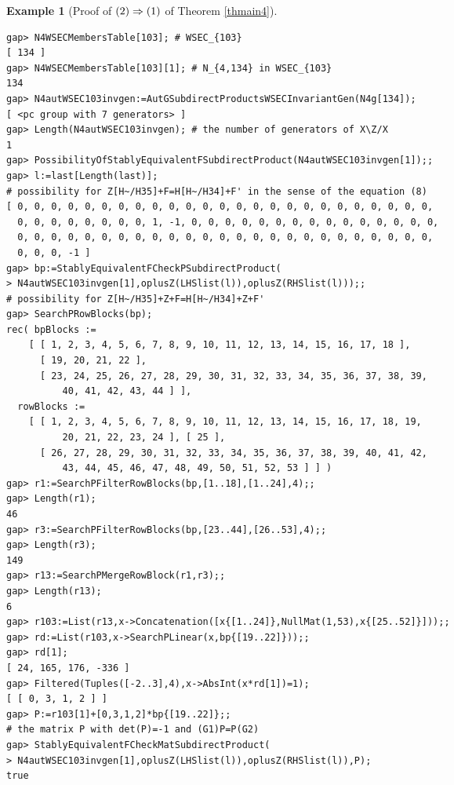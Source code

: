 \documentclass{amsart}
\theoremstyle{plain}
\theoremstyle{definition}
\newtheorem{example}[theorem]{Example}
\theoremstyle{remark}
\begin{document}
\begin{example}[Proof of ${\rm (2)}\Rightarrow {\rm (1)}$ of {Theorem \ref{thmain4}}]
\begin{verbatim}
gap> N4WSECMembersTable[103]; # WSEC_{103}
[ 134 ]
gap> N4WSECMembersTable[103][1]; # N_{4,134} in WSEC_{103}
134
gap> N4autWSEC103invgen:=AutGSubdirectProductsWSECInvariantGen(N4g[134]);
[ <pc group with 7 generators> ]
gap> Length(N4autWSEC103invgen); # the number of generators of X\Z/X
1
gap> PossibilityOfStablyEquivalentFSubdirectProduct(N4autWSEC103invgen[1]);;
gap> l:=last[Length(last)]; 
# possibility for Z[H~/H35]+F=H[H~/H34]+F' in the sense of the equation (8)
[ 0, 0, 0, 0, 0, 0, 0, 0, 0, 0, 0, 0, 0, 0, 0, 0, 0, 0, 0, 0, 0, 0, 0, 0, 0, 
  0, 0, 0, 0, 0, 0, 0, 0, 1, -1, 0, 0, 0, 0, 0, 0, 0, 0, 0, 0, 0, 0, 0, 0, 0, 
  0, 0, 0, 0, 0, 0, 0, 0, 0, 0, 0, 0, 0, 0, 0, 0, 0, 0, 0, 0, 0, 0, 0, 0, 0, 
  0, 0, 0, -1 ]
gap> bp:=StablyEquivalentFCheckPSubdirectProduct(
> N4autWSEC103invgen[1],oplusZ(LHSlist(l)),oplusZ(RHSlist(l)));;
# possibility for Z[H~/H35]+Z+F=H[H~/H34]+Z+F'
gap> SearchPRowBlocks(bp);
rec( bpBlocks := 
    [ [ 1, 2, 3, 4, 5, 6, 7, 8, 9, 10, 11, 12, 13, 14, 15, 16, 17, 18 ], 
      [ 19, 20, 21, 22 ], 
      [ 23, 24, 25, 26, 27, 28, 29, 30, 31, 32, 33, 34, 35, 36, 37, 38, 39, 
          40, 41, 42, 43, 44 ] ], 
  rowBlocks := 
    [ [ 1, 2, 3, 4, 5, 6, 7, 8, 9, 10, 11, 12, 13, 14, 15, 16, 17, 18, 19, 
          20, 21, 22, 23, 24 ], [ 25 ], 
      [ 26, 27, 28, 29, 30, 31, 32, 33, 34, 35, 36, 37, 38, 39, 40, 41, 42, 
          43, 44, 45, 46, 47, 48, 49, 50, 51, 52, 53 ] ] )
gap> r1:=SearchPFilterRowBlocks(bp,[1..18],[1..24],4);;
gap> Length(r1);
46
gap> r3:=SearchPFilterRowBlocks(bp,[23..44],[26..53],4);;
gap> Length(r3);
149
gap> r13:=SearchPMergeRowBlock(r1,r3);;
gap> Length(r13);
6
gap> r103:=List(r13,x->Concatenation([x{[1..24]},NullMat(1,53),x{[25..52]}]));;
gap> rd:=List(r103,x->SearchPLinear(x,bp{[19..22]}));;
gap> rd[1];
[ 24, 165, 176, -336 ]
gap> Filtered(Tuples([-2..3],4),x->AbsInt(x*rd[1])=1);
[ [ 0, 3, 1, 2 ] ]
gap> P:=r103[1]+[0,3,1,2]*bp{[19..22]};; 
# the matrix P with det(P)=-1 and (G1)P=P(G2)
gap> StablyEquivalentFCheckMatSubdirectProduct(
> N4autWSEC103invgen[1],oplusZ(LHSlist(l)),oplusZ(RHSlist(l)),P);
true


\end{verbatim}
\end{example}
\end{document}
